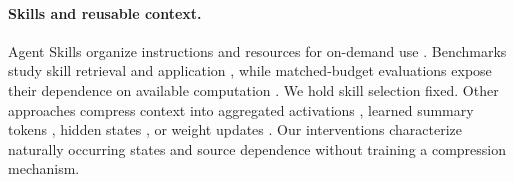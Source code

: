 \paragraph{Skills and reusable context.}
Agent Skills organize instructions and resources for on-demand use
\citep{zhang2025agentskills}. Benchmarks study skill retrieval and application
\citep{su2026srabench,skillsbench2026,sweskills2026}, while matched-budget
evaluations expose their dependence on available computation
\citep{hajimiri2026budgetskills}. We hold skill selection fixed.
Other approaches compress context into aggregated activations
\citep{ardoin2026promptcompression}, learned summary tokens
\citep{mu2023gist}, hidden states \citep{ge2024icae}, or weight updates
\citep{doc2lora2026,deepcontextdistill2025}. Our interventions characterize
naturally occurring states and source dependence without training a
compression mechanism.
